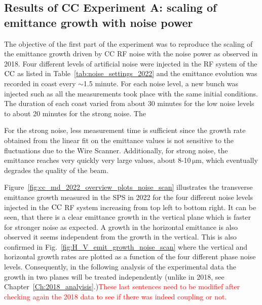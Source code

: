 \subsection{Results of CC Experiment A: scaling of emittance growth with noise power}\label{subsec:cc_md_2022_noise_scan}

The objective of the first part of the experiment was to reproduce the scaling of the emittance growth driven by CC RF noise with the noise power as observed in 2018. Four different levels of artificial noise were injected in the RF system of the ${\mathrm{CC}}$ as listed in Table~\ref{tab:noise_settings_2022} and the emittance evolution was recorded in coast every $\sim$1.5 minute. For each noise level, a new bunch was injected such as all the measurements took place with the same initial conditions. The duration of each coast varied from about 30 minutes for the low noise levels to about 20 minutes for the strong noise. The 

For the strong noise, less measurement time is sufficient since the growth rate obtained from the linear fit on the emittance values is not sensitive to the fluctuations due to the Wire Scanner. Additionally, for strong noise, the emittance reaches very quickly very large values, about 8-10\,$\mathrm{\mu m}$, which eventually degrades the quality of the beam.

Figure~\ref{fig:cc_md_2022_overview_plots_noise_scan} illustrates the transverse emittance growth measured in the SPS in 2022 for the four different noise levels injected in the ${\mathrm{CC}}$ RF system increasing from top left to bottom right. It can be seen, that there is a clear emittance growth in the vertical plane which is faster for stronger noise as expected. A growth in the horizontal emittance is also observed it seems independent from the growth in the vertical. This is also confirmed in Fig.~\ref{fig:H_V_emit_growth_noise_scan} where the vertical and horizontal growth rates are plotted as a function of the four different phase noise levels. Consequently, in the following analysis of the experimental data the growth in two planes will be treated independently (unlike in 2018, see Chapter~\ref{Ch:2018_analyisis}.)\textcolor{red}{These last sentences need to be modifief after checking again the 2018 data to see if there was indeed coupling or not.}


